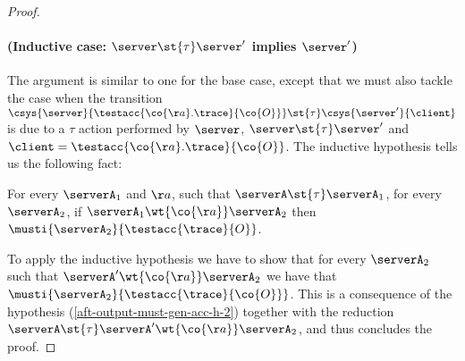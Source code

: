 {\begin{proof}
  \paragraph{(Inductive case: $\server \st{\tau} \server'$ implies $\server'$)}
  The argument is similar to one for the base case, except that
  we must also tackle the case when the transition
  $\csys{ \server }{\testacc{ \co{\aa}.\trace }{ \co{O} }}
  \st{\tau} \csys{\server'}{\client}$ is due to a $\tau$ action performed
  by $\server$, \ie $\server \st{\tau} \server'$ and $\client = \testacc{ \co{\aa}.\trace }{ \co{O} }$.
  The inductive hypothesis tells us the following fact:
  \begin{center}
    For every $\serverA_1$ and $\aa$,
    such that
    $\serverA \st{\tau} \serverA_1$, for every $\serverA_2$,
   if $\serverA_1 \wt{\co{\aa}} \serverA_2$
    then $\musti{\serverA_2}{\testacc{\trace}{O}}$.
  \end{center}
  To apply the inductive hypothesis we have to show that
  for every $\serverA_2$ such that $\serverA' \wt{\co{\aa}} \serverA_2$
  we have that $\musti{\serverA_2}{\testacc{\trace}{ \co{ O }}}$.
  This is a consequence of the hypothesis (\ref{aft-output-must-gen-acc-h-2})
  together with the reduction $\serverA \st{\tau} \serverA' \wt{\co{\aa}} \serverA_2$,
  and thus concludes the proof.
\end{proof}





}
